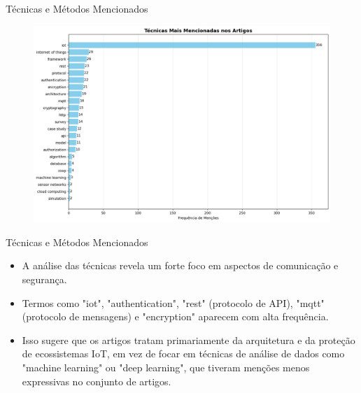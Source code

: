 \documentclass{beamer}
\begin{document}
\begin{frame}{Técnicas e Métodos Mencionados}
    \begin{figure}
        \centering
        \includegraphics[width=\textwidth]{img/tecnicas-mais-mencionadas.png}
    \end{figure}
\end{frame}

\begin{frame}{Técnicas e Métodos Mencionados}
    \begin{itemize}
        \item A análise das técnicas revela um forte foco em aspectos de comunicação e segurança.
        \item Termos como "iot", "authentication", "rest" (protocolo de API), "mqtt" (protocolo de mensagens) e "encryption" aparecem com alta frequência.
        \item Isso sugere que os artigos tratam primariamente da arquitetura e da proteção de ecossistemas IoT, em vez de focar em técnicas de análise de dados como "machine learning" ou "deep learning", que tiveram menções menos expressivas no conjunto de artigos.
    \end{itemize}
\end{frame}
\end{document}
